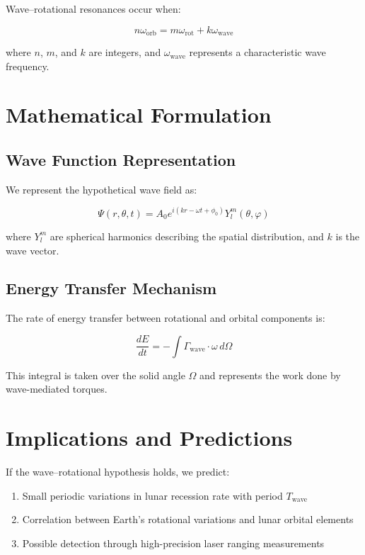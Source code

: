 \documentclass[12pt,a4paper]{article}
\begin{document}
Wave–rotational resonances occur when:

\begin{equation}
n \omega_{\text{orb}} = m \omega_{\text{rot}} + k \omega_{\text{wave}}
\end{equation}

where $n$, $m$, and $k$ are integers, and $\omega_{\text{wave}}$ represents a characteristic wave frequency.

\section{Mathematical Formulation}

\subsection{Wave Function Representation}

We represent the hypothetical wave field as:

\begin{equation}
\Psi(r, \theta, t) = A_0 e^{i(kr - \omega t + \phi_0)} Y_l^m(\theta, \varphi)
\end{equation}

where $Y_l^m$ are spherical harmonics describing the spatial distribution, and $k$ is the wave vector.

\subsection{Energy Transfer Mechanism}

The rate of energy transfer between rotational and orbital components is:

\begin{equation}
\frac{dE}{dt} = -\int \Gamma_{\text{wave}} \cdot \omega \, d\Omega
\end{equation}

This integral is taken over the solid angle $\Omega$ and represents the work done by wave-mediated torques.

\section{Implications and Predictions}

If the wave–rotational hypothesis holds, we predict:

\begin{enumerate}
    \item Small periodic variations in lunar recession rate with period $T_{\text{wave}}$
    \item Correlation between Earth's rotational variations and lunar orbital elements
    \item Possible detection through high-precision laser ranging measurements
\end{enumerate}
\end{document}
